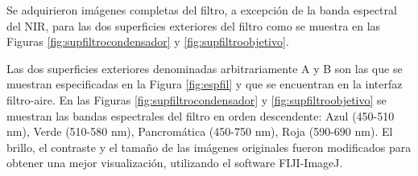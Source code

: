 \hspace{0.5cm}Se adquirieron imágenes completas del filtro, a excepción de la banda espectral del NIR, para las dos superficies exteriores del filtro como se muestra en las Figuras \ref{fig:supfiltrocondensador} y \ref{fig:supfiltroobjetivo}.
\begin{figure}[H]
	\begin{floatrow}
	\end{floatrow}
\end{figure}
 Las dos superficies exteriores denominadas arbitrariamente A y B son las que se muestran especificadas en la Figura \ref{fig:espfil} y que se encuentran en la interfaz filtro-aire. En las Figuras \ref{fig:supfiltrocondensador} y \ref{fig:supfiltroobjetivo} se muestran las bandas espectrales del filtro en orden descendente: Azul (450-510 nm), Verde (510-580 nm), Pancromática (450-750 nm), Roja (590-690 nm). El brillo, el contraste y el tamaño de las imágenes originales fueron modificados para obtener una mejor visualización, utilizando el software FIJI-ImageJ. 
